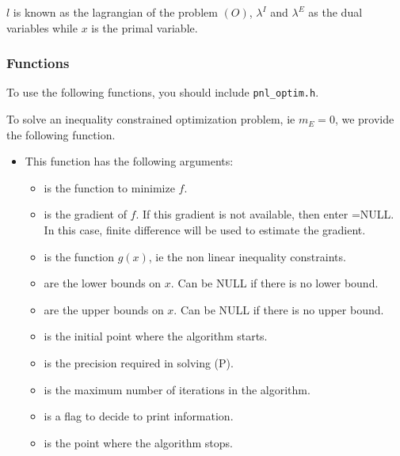 $l$ is known as the lagrangian of the problem $(O)$, $\lambda^I$ and $\lambda^E$ as the dual variables while $x$ is the primal variable.

\subsubsection{Functions}

To use the following functions, you should include \verb!pnl_optim.h!.

To solve an inequality constrained optimization problem, ie $m_E=0$, we provide the following function.
\begin{itemize}
\item {}
  \sshortdescribe This function has the following arguments:

  \begin{itemize}
  \item {} is the function to minimize $f$.
  \item {} is the gradient of $f$. If this gradient is not available, then enter =NULL. In this case, finite difference will be used to estimate the gradient.
  \item {} is the function $g(x)$, ie the non linear inequality constraints.
  \item {} are the lower bounds on $x$. Can be NULL if there is no
    lower bound.
  \item {} are the upper bounds on $x$. Can be NULL if there is no
    upper bound.
  \item {} is the initial point where the algorithm starts.
  \item {} is the precision required in solving (P).
  \item {} is the maximum number of iterations in the algorithm.
  \item {} is a flag to decide to print information.
  \item {} is the point where the algorithm stops.
  \end{itemize}


\end{itemize}
